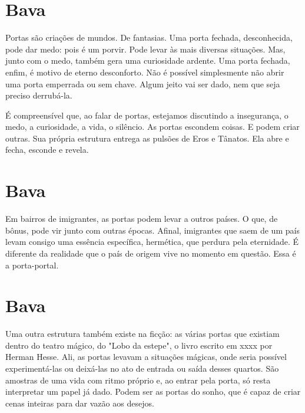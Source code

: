 \chapter*{Bava }
\smallskip{}

Portas são criações de mundos. De fantasias. Uma porta fechada, desconhecida, pode dar medo: pois é um porvir. Pode levar às mais diversas situações. Mas, junto com o medo, também gera uma curiosidade ardente. Uma porta fechada, enfim, é motivo de eterno desconforto. Não é possível simplesmente não abrir uma porta emperrada ou sem chave. Algum jeito vai ser dado, nem que seja preciso derrubá-la.

É compreensível que, ao falar de portas, estejamos discutindo a insegurança, o medo, a curiosidade, a vida, o silêncio. As portas escondem coisas. E podem criar outras. Sua própria estrutura entrega as pulsões de Eros e Tânatos. Ela abre e fecha, esconde e revela. 

\chapter*{Bava }
\smallskip{}

Em bairros de imigrantes, as portas podem levar a outros países. O que, de bônus, pode vir junto com outras épocas. Afinal, imigrantes que saem de um país levam consigo uma essência específica, hermética, que perdura pela eternidade. É diferente da realidade que o país de origem vive no momento em questão. Essa é a porta-portal.

\chapter*{Bava }
\smallskip{}

Uma outra estrutura também existe na ficção: as várias portas que existiam dentro do teatro mágico, do "Lobo da estepe", o livro escrito em xxxx por Herman Hesse. Ali, as portas levavam a situações mágicas, onde seria possível experimentá-las ou deixá-las no ato de entrada ou saída desses quartos. São amostras de uma vida com ritmo próprio e, ao entrar pela porta, só resta interpretar um papel já dado. Podem ser as portas do sonho, que é capaz de criar cenas inteiras para dar vazão aos desejos.

